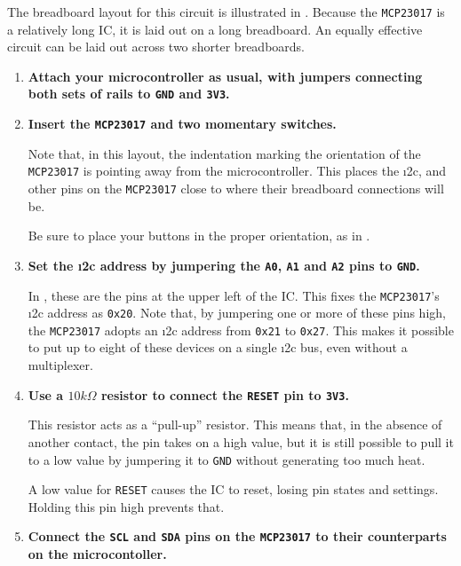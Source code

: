 The breadboard layout for this circuit is illustrated in .
Because the \texttt{MCP23017} is a relatively long IC, it is laid out on a long breadboard.
An equally effective circuit can be laid out across two shorter breadboards.

\begin{enumerate}
	\item \textbf{Attach your microcontroller as usual, with jumpers connecting both sets of rails to \texttt{GND} and \texttt{3V3}.}

	\item \textbf{Insert the \texttt{MCP23017} and two momentary switches.}

	Note that, in this layout, the indentation marking the orientation of the \texttt{MCP23017} is pointing away from the microcontroller.
  This places the \i2c, \gpios and other pins on the \texttt{MCP23017} close to where their breadboard connections will be.

	\smallskip
	Be sure to place your buttons in the proper orientation, as in .

	\item \textbf{Set the \i2c address by jumpering the \texttt{A0}, \texttt{A1} and \texttt{A2} pins to \texttt{GND}.}

	In , these are the pins at the upper left of the IC.
	This fixes the \texttt{MCP23017}'s \i2c address as \verb|0x20|.
	Note that, by jumpering one or more of these pins high, the \texttt{MCP23017} adopts an \i2c address from \verb|0x21| to \verb|0x27|.
	This makes it possible to put up to eight of these devices on a single \i2c bus, even without a multiplexer.

	\item \textbf{Use a $10k\Omega$ resistor to connect the \texttt{RESET} pin to \texttt{3V3}.}

	This resistor acts as a ``pull-up'' resistor.
	This means that, in the absence of another contact, the pin takes on a high value, but it is still possible to pull it to a low value by jumpering it to \texttt{GND} without generating too much heat.

	\smallskip
	A low value for \texttt{RESET} causes the IC to reset, losing pin states and settings.
	Holding this pin high prevents that.

	\item \textbf{Connect the \texttt{SCL} and \texttt{SDA} pins on the \texttt{MCP23017} to their counterparts on the microcontoller.}



\end{enumerate}

